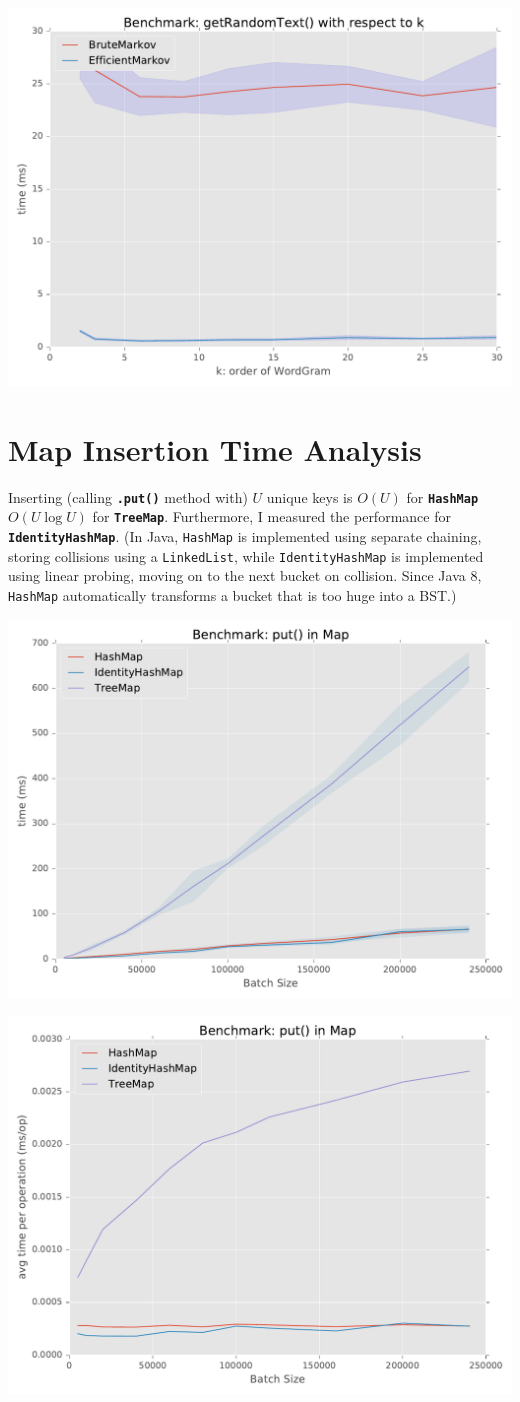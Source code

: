 \documentclass[11pt]{article}
\begin{document}
\centerline{\includegraphics[width=0.6\linewidth]{getRandomText_k.pdf}}

\section{Map Insertion Time Analysis}

Inserting (calling \texttt{\bf .put()} method with) $U$ unique keys is $O(U)$ for \texttt{\bf HashMap} $O(U\log U)$ for \texttt{\bf TreeMap}. Furthermore, I measured the performance for \texttt{\bf IdentityHashMap}. (In Java, \texttt{HashMap} is implemented using separate chaining, storing collisions using a \texttt{LinkedList}, while \texttt{IdentityHashMap} is implemented using linear probing, moving on to the next bucket on collision. Since Java 8, \texttt{HashMap} automatically transforms a bucket that is too huge into a BST.)

\centerline{\includegraphics[width=0.6\linewidth]{bench_map_total.pdf}}

\centerline{\includegraphics[width=0.6\linewidth]{bench_map_avg.pdf}}
\end{document}
